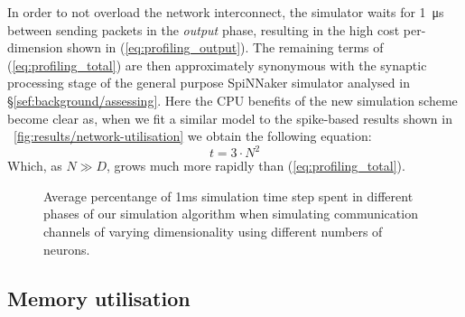 \documentclass[conference]{IEEEtran}
\begin{document}
In order to not overload the network interconnect, the simulator waits for \SI{1}{\micro\second} between sending packets in the \textit{output} phase, resulting in the high cost per-dimension shown in (\ref{eq:profiling_output}). 
The remaining terms of (\ref{eq:profiling_total}) are then approximately synonymous with the synaptic processing stage of the general purpose SpiNNaker simulator analysed in \S\ref{sef:background/assessing}.
Here the CPU benefits of the new simulation scheme become clear as, when we fit a similar model to the spike-based results shown in \figurename~\ref{fig:results/network-utilisation} we obtain the following equation:
%
\begin{equation}
  t = 3 \cdot N^{2}
\end{equation}
%
Which, as $N \gg D$, grows much more rapidly than (\ref{eq:profiling_total}).

  \begin{figure}[!t]
    \centering
    \hfil
    \caption{Average percentange of 1ms simulation time step spent in different phases of our simulation algorithm when simulating communication channels of varying dimensionality using different numbers of neurons.}
    \label{fig:results/comm-channel-cpu}
  \end{figure}

  \subsection{Memory utilisation}
\end{document}
